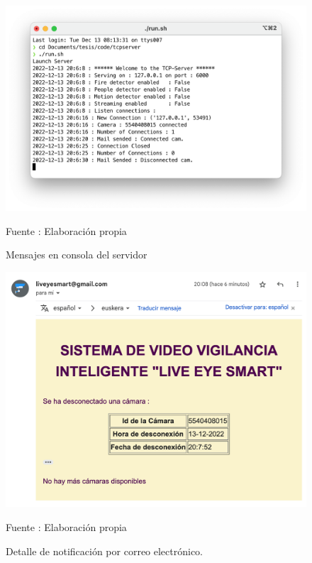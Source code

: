 \begin{figure}[H]
    \begin{center}
        \includegraphics[width=12cm]{img/capitulo_6/cam_disconnected_1_cam.png}
    \end{center}
    \begin{center}
        \caption{Mensajes en consola del servidor}
        Fuente : Elaboración propia
    \end{center}
\end{figure}

\begin{figure}[H]
    \begin{center}
        \includegraphics[width=12cm]{img/capitulo_6/mail4.png}
    \end{center}
    \begin{center}
        \caption{Detalle de notificación por correo electrónico.}
        Fuente : Elaboración propia
    \end{center}
\end{figure}

